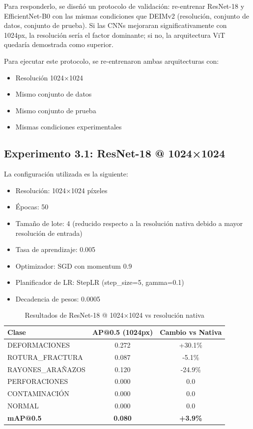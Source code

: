 Para responderlo, se diseñó un protocolo de validación: re-entrenar ResNet-18 y EfficientNet-B0 con las mismas condiciones que DEIMv2 (resolución, conjunto de datos, conjunto de prueba). Si las CNNs mejoraran significativamente con 1024px, la resolución sería el factor dominante; si no, la arquitectura ViT quedaría demostrada como superior.

Para ejecutar este protocolo, se re-entrenaron ambas arquitecturas con:
\begin{itemize}
    \item Resolución 1024×1024
    \item Mismo conjunto de datos
    \item Mismo conjunto de prueba
    \item Mismas condiciones experimentales
\end{itemize}

\subsection{Experimento 3.1: ResNet-18 @ 1024×1024}

La configuración utilizada es la siguiente:
\begin{itemize}
    \item Resolución: 1024×1024 píxeles
    \item Épocas: 50
    \item Tamaño de lote: 4 (reducido respecto a la resolución nativa debido a mayor resolución de entrada)
    \item Tasa de aprendizaje: 0.005
    \item Optimizador: SGD con momentum 0.9
    \item Planificador de LR: StepLR (step\_size=5, gamma=0.1)
    \item Decadencia de pesos: 0.0005
\end{itemize}

\begin{table}[htbp]
\centering
\begin{tabular}{lcc}
\toprule
\textbf{Clase} & \textbf{AP@0.5 (1024px)} & \textbf{Cambio vs Nativa} \\
\midrule
DEFORMACIONES & 0.272 & +30.1\% \\
\mbox{ROTURA\_FRACTURA} & 0.087 & -5.1\% \\
\mbox{RAYONES\_ARAÑAZOS} & 0.120 & -24.9\% \\
PERFORACIONES & 0.000 & 0.0 \\
CONTAMINACIÓN & 0.000 & 0.0 \\
NORMAL & 0.000 & 0.0 \\
\midrule
\textbf{mAP@0.5} & \textbf{0.080} & \textbf{+3.9\%} \\
\bottomrule
\end{tabular}
\caption{Resultados de ResNet-18 @ 1024×1024 vs resolución nativa}
\label{tab:resnet18_1024}
\end{table}

